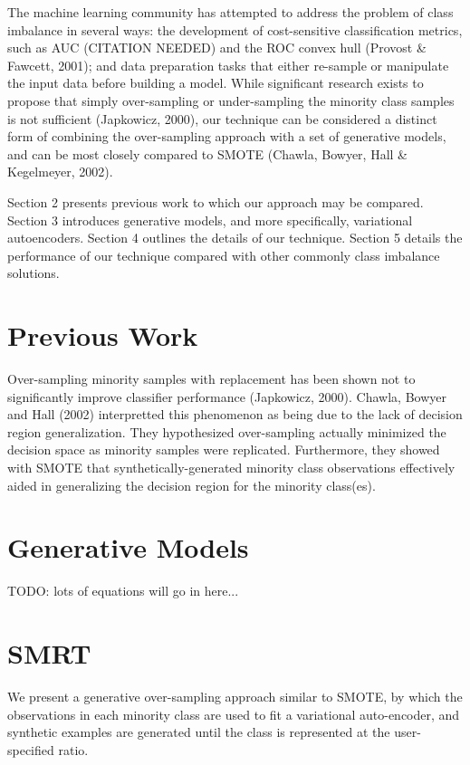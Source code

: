 \documentclass[twoside,11pt]{article}
\begin{document}
The machine learning community has attempted to address the problem of class imbalance in several ways: the development of cost-sensitive classification metrics, such as AUC (CITATION NEEDED) and the ROC convex hull (Provost \& Fawcett, 2001); and data preparation tasks that either re-sample or manipulate the input data before building a model. While significant research exists to propose that simply over-sampling or under-sampling the minority class samples is not sufficient (Japkowicz, 2000), our technique can be considered a distinct form of combining the over-sampling approach with a set of generative models, and can be most closely compared to SMOTE (Chawla, Bowyer, Hall \& Kegelmeyer, 2002).

Section 2 presents previous work to which our approach may be compared. Section 3 introduces generative models, and more specifically, variational autoencoders. Section 4 outlines the details of our technique. Section 5 details the performance of our technique compared with other commonly class imbalance solutions. \\

\section{Previous Work}

Over-sampling minority samples with replacement has been shown not to significantly improve classifier performance (Japkowicz, 2000).  Chawla, Bowyer and Hall (2002) interpretted this phenomenon as being due to the lack of decision region generalization. They hypothesized over-sampling actually minimized the decision space as minority samples were replicated. Furthermore, they showed with SMOTE that synthetically-generated minority class observations effectively aided in generalizing the decision region for the minority class(es).

\section{Generative Models}

TODO: lots of equations will go in here...

\section{SMRT}

We present a generative over-sampling approach similar to SMOTE, by which the observations in each minority class are used to fit a variational auto-encoder, and synthetic examples are generated until the class is represented at the user-specified ratio. \\
\end{document}
